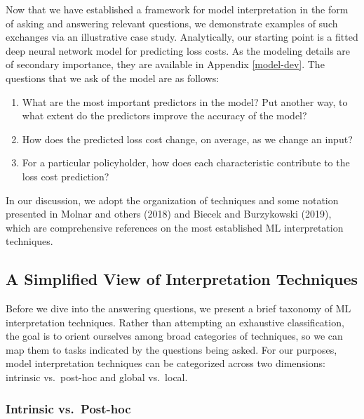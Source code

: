 \documentclass[preprint, 3p, twocolumn, letterpaper, 10pt]{elsarticle} %
\providecommand{\tightlist}{%
  \setlength{\itemsep}{0pt}\setlength{\parskip}{0pt}}
\begin{document}
Now that we have established a framework for model interpretation in the form of
asking and answering relevant questions, we demonstrate examples of such
exchanges via an illustrative case study. Analytically, our starting point is a
fitted deep neural network model for predicting loss costs. As the modeling
details are of secondary importance, they are available in Appendix
\ref{model-dev}. The questions that we ask of the model are as follows:

\begin{enumerate}
\def\labelenumi{\arabic{enumi}.}
\tightlist
\item
  What are the most important predictors in the model? Put another way, to
  what extent do the predictors improve the accuracy of the model?
\item
  How does the predicted loss cost change, on average, as we change an input?
\item
  For a particular policyholder, how does each characteristic contribute to
  the loss cost prediction?
\end{enumerate}

In our discussion, we adopt the organization of techniques and some notation
presented in Molnar and others (2018) and Biecek and Burzykowski (2019), which are comprehensive
references on the most established ML interpretation techniques.

\hypertarget{a-simplified-view-of-interpretation-techniques}{%
\subsection{A Simplified View of Interpretation Techniques}\label{a-simplified-view-of-interpretation-techniques}}

Before we dive into the answering questions, we present a brief taxonomy of ML
interpretation techniques. Rather than attempting an exhaustive classification,
the goal is to orient ourselves among broad categories of techniques, so we can
map them to tasks indicated by the questions being asked. For our purposes,
model interpretation techniques can be categorized across two dimensions:
intrinsic vs.~post-hoc and global vs.~local.

\hypertarget{intrinsic-vs.post-hoc}{%
\subsubsection{Intrinsic vs.~Post-hoc}\label{intrinsic-vs.post-hoc}}
\end{document}
